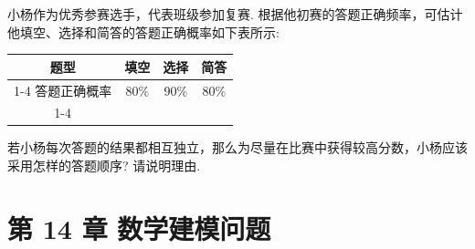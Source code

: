 小杨作为优秀参赛选手，代表班级参加复赛. 根据他初赛的答题正确频率，可估计他填空、选择和简答的答题正确概率如下表所示:

\begin{center}

\begin{tabular}{|c|c|c|c|}
\hline
题型 & 填空 & 选择 & 简答 \\
\cline{1-4}
答题正确概率 & 80\% & 90\% & 80\% \\
\cline{1-4}
\hline
\end{tabular}
\end{center}

若小杨每次答题的结果都相互独立，那么为尽量在比赛中获得较高分数，小杨应该采用怎样的答题顺序? 请说明理由.

\section*{第 14 章 数学建模问题}

